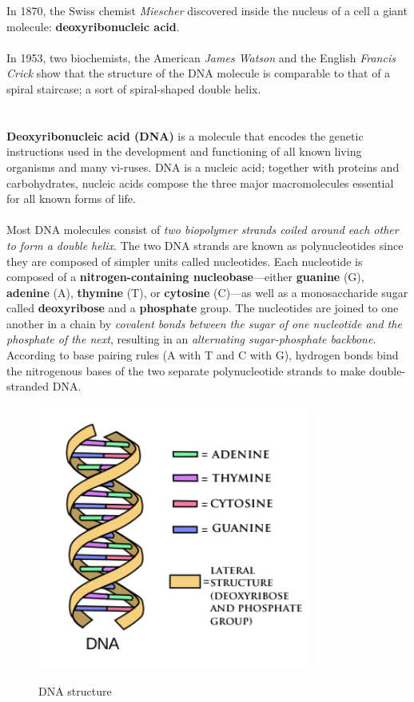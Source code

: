 In 1870, the Swiss chemist \emph{Miescher} discovered inside the nucleus of a cell a giant molecule: \textbf{deoxyribonucleic acid}. 
\\
\\In 1953, two biochemists, the American \emph{James Watson} and the English \emph{Francis Crick} show that the structure of the DNA molecule is comparable to that of a spiral staircase; a sort of spiral-shaped double helix.
\\
\\
\\	
\textbf{Deoxyribonucleic acid (DNA)} is a molecule that encodes the genetic instructions used in the development and functioning of all known living organisms and many vi-ruses. DNA is a nucleic acid; together with proteins and carbohydrates, nucleic acids compose the three major macromolecules essential for all known forms of life.
\\
\\Most DNA molecules consist of \emph{two biopolymer strands coiled around each other to form a double helix}. The two DNA strands are known as polynucleotides since they are composed of simpler units called nucleotides. Each nucleotide is composed of a \textbf{nitrogen-containing nucleobase}—either \textbf{guanine} (G), \textbf{adenine} (A), \textbf{thymine} (T), or \textbf{cytosine} (C)—as well as a monosaccharide sugar called \textbf{deoxyribose} and a \textbf{phosphate} group. The nucleotides are joined to one another in a chain by \emph{covalent bonds between the sugar of one nucleotide and the phosphate of the next}, resulting in an \emph{alternating sugar-phosphate backbone}. According to base pairing rules (A with T and C with G), hydrogen bonds bind the nitrogenous bases of the two separate polynucleotide strands to make double-stranded DNA.

\begin{figure}[ht!]
	\centering
	\includegraphics[width=90mm]{../Images/DNA_double_helix.png}
	\label{overflow}
	\caption{DNA structure}
	\end{figure}

